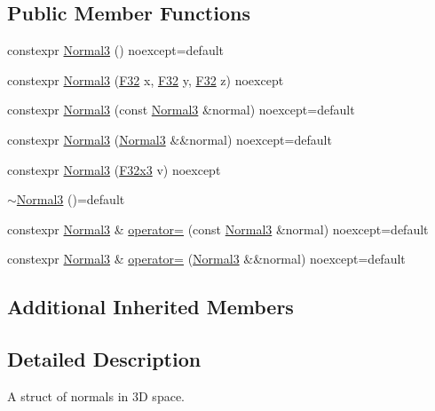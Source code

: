 \subsection*{Public Member Functions}
\begin{DoxyCompactItemize}
\item 
constexpr \mbox{\hyperlink{structmage_1_1_normal3_a31cd202f6cda288c0b4702e232007b39}{Normal3}} () noexcept=default
\item 
constexpr \mbox{\hyperlink{structmage_1_1_normal3_a7ff657d4eea97a894d0ee7ad3cb02a16}{Normal3}} (\mbox{\hyperlink{namespacemage_aa97e833b45f06d60a0a9c4fc22ae02c0}{F32}} x, \mbox{\hyperlink{namespacemage_aa97e833b45f06d60a0a9c4fc22ae02c0}{F32}} y, \mbox{\hyperlink{namespacemage_aa97e833b45f06d60a0a9c4fc22ae02c0}{F32}} z) noexcept
\item 
constexpr \mbox{\hyperlink{structmage_1_1_normal3_ae85b31999c0f2b3f63fd854275a9ef85}{Normal3}} (const \mbox{\hyperlink{structmage_1_1_normal3}{Normal3}} \&normal) noexcept=default
\item 
constexpr \mbox{\hyperlink{structmage_1_1_normal3_a2f0bf2d017db9e1e7e214d3a9a849764}{Normal3}} (\mbox{\hyperlink{structmage_1_1_normal3}{Normal3}} \&\&normal) noexcept=default
\item 
constexpr \mbox{\hyperlink{structmage_1_1_normal3_aefed0af318bd76295b614153e75c3846}{Normal3}} (\mbox{\hyperlink{namespacemage_a0fef5ab4e073c2d9ea876fefa3da4233}{F32x3}} v) noexcept
\item 
\mbox{\hyperlink{structmage_1_1_normal3_a3384b2970fd85fe729514ce0686b4446}{$\sim$\+Normal3}} ()=default
\item 
constexpr \mbox{\hyperlink{structmage_1_1_normal3}{Normal3}} \& \mbox{\hyperlink{structmage_1_1_normal3_aeeb43d61c914bc975c22e059b8bbeec9}{operator=}} (const \mbox{\hyperlink{structmage_1_1_normal3}{Normal3}} \&normal) noexcept=default
\item 
constexpr \mbox{\hyperlink{structmage_1_1_normal3}{Normal3}} \& \mbox{\hyperlink{structmage_1_1_normal3_a59aca1c2a1eb936c36bce64b4b5936b9}{operator=}} (\mbox{\hyperlink{structmage_1_1_normal3}{Normal3}} \&\&normal) noexcept=default
\end{DoxyCompactItemize}
\subsection*{Additional Inherited Members}


\subsection{Detailed Description}
A struct of normals in 3D space.

